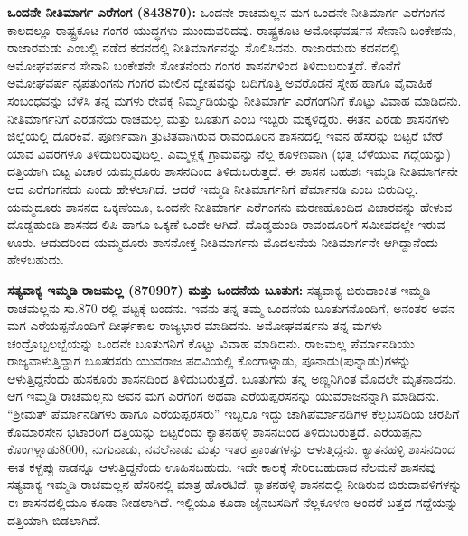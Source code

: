 \textbf{ಒಂದನೇ ನೀತಿಮಾರ್ಗ ಎರೆಗಂಗ (843\general{\enginline{-}}870):} ಒಂದನೇ ರಾಚಮಲ್ಲನ ಮಗ ಒಂದನೇ ನೀತಿಮಾರ್ಗ ಎರೆಗಂಗನ ಕಾಲದಲ್ಲೂ ರಾಷ್ಟ್ರಕೂಟ ಗಂಗರ ಯುದ್ಧಗಳು ಮುಂದುವರಿದವು. ರಾಷ್ಟ್ರಕೂಟ ಅಮೋಘವರ್ಷನ ಸೇನಾನಿ ಬಂಕೇಶನು, ರಾಜಾರಮಡು ಎಂಬಲ್ಲಿ ನಡೆದ ಕದನದಲ್ಲಿ ನೀತಿಮಾರ್ಗನನ್ನು ಸೊಲಿಸಿದನು. ರಾಜಾರಮಡು ಕದನದಲ್ಲಿ ಅಮೋಘವರ್ಷನ ಸೇನಾನಿ ಬಂಕೇಶನೇ ಸೋತನೆಂದು ಗಂಗರ ಶಾಸನಗಳಿಂದ ತಿಳಿದುಬರುತ್ತದೆ. ಕೊನೆಗೆ ಅಮೋಘವರ್ಷ ನೃಪತುಂಗನು ಗಂಗರ ಮೇಲಿನ ದ್ವೇಷವನ್ನು ಬದಿಗೊತ್ತಿ ಅವರೊಡನೆ ಸ್ನೇಹ ಹಾಗೂ ವೈವಾಹಿಕ ಸಂಬಂಧವನ್ನು ಬೆಳೆಸಿ ತನ್ನ ಮಗಳು ರೇವಕ್ಕ ನಿರ್ಮ್ಮಡಿಯನ್ನು ನೀತಿಮಾರ್ಗ ಎರೆಗಂಗನಿಗೆ ಕೊಟ್ಟು ವಿವಾಹ ಮಾಡಿದನು. ನೀತಿಮಾರ್ಗನಿಗೆ ಎರಡನೆಯ ರಾಚಮಲ್ಲ ಮತ್ತು ಬೂತುಗ ಎಂಬ ಇಬ್ಬರು ಮಕ್ಕಳಿದ್ದರು. ಈತನ ಎರಡು ಶಾಸನಗಳು ಜಿಲ್ಲೆಯಲ್ಲಿ ದೊರಕಿವೆ. ಪೂರ್ಣವಾಗಿ ತ್ರುಟಿತವಾಗಿರುವ ರಾವಂದೂರಿನ ಶಾಸನದಲ್ಲಿ ಇವನ ಹೆಸರನ್ನು ಬಿಟ್ಟರೆ ಬೇರೆ ಯಾವ ವಿವರಗಳೂ ತಿಳಿದುಬರುವುದಿಲ್ಲ. ಎಮ್ಮಳ್ದಕ್ಕೆ ಗ್ರಾಮವನ್ನು ನೆಲ್ಲ ಕೂಳಣವಾಗಿ (ಭತ್ತ ಬೆಳೆಯುವ ಗದ್ದೆಯನ್ನು) ದತ್ತಿಯಾಗಿ ಬಿಟ್ಟ ವಿಚಾರ ಯಮ್ಮದೂರು ಶಾಸನದಿಂದ ತಿಳಿದುಬರುತ್ತದೆ.  ಈ ಶಾಸನ ಬಹುಶಃ ಇಮ್ಮಡಿ ನೀತಿಮಾರ್ಗನೇ ಆದ ಎರೆಗಂಗನದು ಎಂದು ಹೇಳಲಾಗಿದೆ. ಆದರೆ ಇಮ್ಮಡಿ ನೀತಿಮಾರ್ಗನಿಗೆ ಪೆರ್ಮಾನಡಿ ಎಂಬ ಬಿರುದಿಲ್ಲ. ಯಮ್ಮದೂರು ಶಾಸನದ ಒಕ್ಕಣೆಯೂ, ಒಂದನೇ ನೀತಿಮಾರ್ಗ ಎರೆಗಂಗನು ಮರಣಹೊಂದಿದ ವಿಚಾರವನ್ನು ಹೇಳುವ ದೊಡ್ಡಹುಂಡಿ ಶಾಸನದ ಲಿಪಿ ಹಾಗೂ ಒಕ್ಕಣೆ ಒಂದೇ ಆಗಿದೆ. ದೊಡ್ಡಹುಂಡಿ ರಾವಂದೂರಿಗೆ ಸಮೀಪದಲ್ಲೇ ಇರುವ ಊರು. ಆದುದರಿಂದ ಯಮ್ಮದೂರು ಶಾಸನೋಕ್ತ ನೀತಿಮಾರ್ಗನು ಮೊದಲನೆಯ ನೀತಿಮಾರ್ಗನೇ ಆಗಿದ್ದಾನೆಂದು ಹೇಳಬಹುದು.

\textbf{ಸತ್ಯವಾಕ್ಯ ಇಮ್ಮಡಿ ರಾಜಮಲ್ಲ (870\general{\enginline{-}}907) ಮತ್ತು ಒಂದನೆಯ ಬೂತುಗ: } ಸತ್ಯವಾಕ್ಯ ಬಿರುದಾಂಕಿತ ಇಮ್ಮಡಿ ರಾಚಮಲ್ಲನು ಸು.870 ರಲ್ಲಿ ಪಟ್ಟಕ್ಕೆ ಬಂದನು. ಇವನು ತನ್ನ ತಮ್ಮ ಒಂದನೆಯ ಬೂತುಗನೊಂದಿಗೆ, ಅನಂತರ ಅವನ ಮಗ ಎರೆಯಪ್ಪನೊಂದಿಗೆ ದೀರ್ಘಕಾಲ ರಾಜ್ಯಭಾರ ಮಾಡಿದನು. ಅಮೋಘವರ್ಷನು ತನ್ನ ಮಗಳು ಚಂದ್ರೊಬ್ಬಲಬ್ಬೆಯನ್ನು ಒಂದನೇ ಬೂತುಗನಿಗೆ ಕೊಟ್ಟು ವಿವಾಹ ಮಾಡಿದನು. ರಾಜಮಲ್ಲ ಪೆರ್ಮಾನಡಿಯು ರಾಜ್ಯವಾಳುತ್ತಿದ್ದಾಗ ಬೂತರಸರು ಯುವರಾಜ ಪದವಿಯಲ್ಲಿ ಕೊಂಗಾಳ್ನಾಡು, ಪೂನಾಡು(ಪುನ್ನಾಡು)ಗಳನ್ನು ಆಳುತ್ತಿದ್ದನೆಂದು ಹುಸಕೂರು ಶಾಸನದಿಂದ ತಿಳಿದುಬರುತ್ತದೆ. ಬೂತುಗನು ತನ್ನ ಅಣ್ಣನಿಗಿಂತ ಮೊದಲೇ ಮೃತನಾದನು. ಆಗ ಇಮ್ಮಡಿ ರಾಚಮಲ್ಲನು ಅವನ ಮಗ ಎರೆಗಂಗ ಅಥವಾ ಎರೆಯಪ್ಪರಸನನ್ನು ಯುವರಾಜನನ್ನಾಗಿ ಮಾಡಿದನು. “ಶ‍್ರೀಮತ್​ ಪೆರ್ಮಾನಡಿಗಳು ಹಾಗೂ ಎರೆಯಪ್ಪರಸರು” ಇಬ್ಬರೂ ಇದ್ದು ಚಾಗಿಪೆರ್ಮಾನಡಿಗಳ ಕೆಲ್ಲಬಸದಿಯ ಚರಪಿಗೆ ಕೊಮಾರಸೇನ ಭಟಾರರಿಗೆ ದತ್ತಿಯನ್ನು ಬಿಟ್ಟರೆಂದು ಕ್ಯಾತನಹಳ್ಳಿ ಶಾಸನದಿಂದ ತಿಳಿದುಬರುತ್ತದೆ. ಎರೆಯಪ್ಪನು ಕೊಂಗಳ್ನಾಡು8000, ನುಗುನಾಡು, ನವಲೆನಾಡು ಮತ್ತು ಇತರ ಪ್ರಾಂತಗಳನ್ನು ಆಳುತ್ತಿದ್ದನು. ಕ್ಯಾತನಹಳ್ಳಿ ಶಾಸನದಿಂದ ಈತ ಕಳ್ಬಪ್ಪು ನಾಡನ್ನೂ ಆಳುತ್ತಿದ್ದನೆಂದು ಊಹಿಸಬಹುದು. ಇದೇ ಕಾಲಕ್ಕೆ ಸೇರಿರಬಹುದಾದ ನೆಲಮನೆ ಶಾಸನವು ಸತ್ಯವಾಕ್ಯ ಇಮ್ಮಡಿ ರಾಚಮಲ್ಲನ ಹೆಸರಿನಲ್ಲಿ ಮಾತ್ರ ಹೊರಟಿದೆ. ಕ್ಯಾತನಹಳ್ಳಿ ಶಾಸನದಲ್ಲಿ ನೀಡಿರುವ ಬಿರುದಾವಳಿಗಳನ್ನು ಈ ಶಾಸನದಲ್ಲಿಯೂ ಕೂಡಾ ನೀಡಲಾಗಿದೆ. ಇಲ್ಲಿಯೂ ಕೂಡಾ ಜೈನಬಸದಿಗೆ ನೆಲ್ಲಕೂಳಣ ಅಂದರೆ ಬತ್ತದ ಗದ್ದೆಯನ್ನು ದತ್ತಿಯಾಗಿ ಬಿಡಲಾಗಿದೆ.

